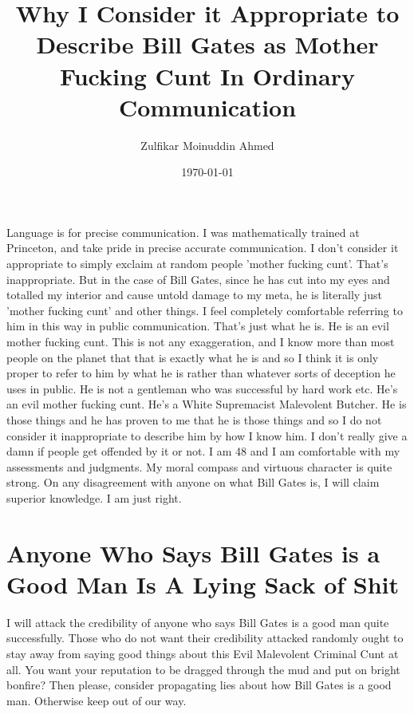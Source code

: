 \documentclass{amsart}
\title{Why I Consider it Appropriate to Describe Bill Gates as Mother Fucking Cunt In Ordinary Communication}
\author{Zulfikar Moinuddin Ahmed}
\date{\today}
\begin{document}
\maketitle

Language is for precise communication.  I was mathematically trained at Princeton, and take pride in precise accurate communication.  I don't consider it appropriate to simply exclaim at random people 'mother fucking cunt'.  That's inappropriate.  But in the case of Bill Gates, since he has cut into my eyes and totalled my interior and cause untold damage to my meta, he is literally just 'mother fucking cunt' and other things.  I feel completely comfortable referring to him in this way in public communication.  That's just what he is.  He is an evil mother fucking cunt.  This is not any exaggeration, and I know more than most people on the planet that that is exactly what he is and so I think it is only proper to refer to him by what he is rather than whatever sorts of deception he uses in public.  He is not a gentleman who was successful by hard work etc.  He's an evil mother fucking cunt.  He's a White Supremacist Malevolent Butcher.  He is those things and he has proven to me that he is those things and so I do not consider it inappropriate to describe him by how I know him.  I don't really give a damn if people get offended by it or not. I am 48 and I am comfortable with my assessments and judgments.  My moral compass and virtuous character is quite strong.  On any disagreement with anyone on what Bill Gates is, I will claim superior knowledge.  I am just right.

\section{Anyone Who Says Bill Gates is a Good Man Is A Lying Sack of Shit}

I will attack the credibility of anyone who says Bill Gates is a good man quite successfully.  Those who do not want their credibility attacked randomly ought to stay away from saying good things about this Evil Malevolent Criminal Cunt at all.  You want your reputation to be dragged through the mud and put on bright bonfire?  Then please, consider propagating lies about how Bill Gates is a good man.  Otherwise keep out of our way.
\end{document}
